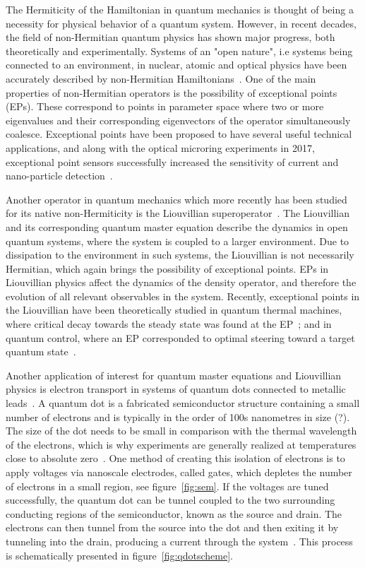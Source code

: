 \documentclass[../main.tex]{subfiles}
\begin{document}
The Hermiticity of the Hamiltonian in quantum mechanics is thought of being a necessity for physical behavior of a quantum system. However, in recent decades, the field of non-Hermitian quantum physics has shown major progress, both theoretically and experimentally. Systems of an "open nature", i.e systems being connected to an environment, in nuclear, atomic and optical physics have been accurately described by non-Hermitian Hamiltonians~\cite{nonHermrev}. One of the main properties of non-Hermitian operators is the possibility of exceptional points (EPs). These correspond to points in parameter space where two or more eigenvalues and their corresponding eigenvectors of the operator simultaneously coalesce. Exceptional points have been proposed to have several useful technical applications, and along with the optical microring experiments in 2017, exceptional point sensors successfully increased the sensitivity of current and nano-particle detection~\cite{microring1, microring2}.

Another operator in quantum mechanics which more recently has been studied for its native non-Hermiticity is the Liouvillian superoperator~\cite{recentliou, thermal, steering}. The Liouvillian and its corresponding quantum master equation describe the dynamics in open quantum systems, where the system is coupled to a larger environment. Due to dissipation to the environment in such systems, the Liouvillian is not necessarily Hermitian, which again brings the possibility of exceptional points. EPs in Liouvillian physics affect the dynamics of the density operator, and therefore the evolution of all relevant observables in the system. Recently, exceptional points in the Liouvillian have been theoretically studied in quantum thermal machines, where critical decay towards the steady state was found at the EP~\cite{thermal}; and in quantum control, where an EP corresponded to optimal steering toward a target quantum state~\cite{steering}. 

Another application of interest for quantum master equations and Liouvillian physics is electron transport in systems of quantum dots connected to metallic leads~\cite{qdottrans}. A quantum dot is a fabricated semiconductor structure containing a small number of electrons and is typically in the order of 100s nanometres in size (?). The size of the dot needs to be small in comparison with the thermal wavelength of the electrons, which is why experiments are generally realized at temperatures close to absolute zero~\cite{transport}. One method of creating this isolation of electrons is to apply voltages via nanoscale electrodes, called gates, which depletes the number of electrons in a small region, see figure~\ref{fig:sem}. If the voltages are tuned successfully, the quantum dot can be tunnel coupled to the two surrounding conducting regions of the semiconductor, known as the source and drain. The electrons can then tunnel from the source into the dot and then exiting it by tunneling into the drain, producing a current through the system~\cite{qdotmarcus}. This process is schematically presented in figure~\ref{fig:qdotscheme}.
\end{document}
